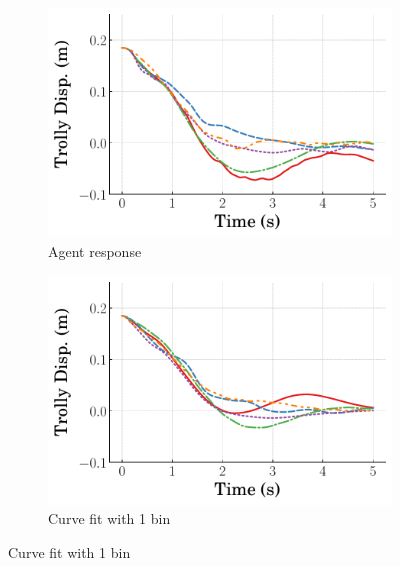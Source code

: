 %
\begin{figure}
    \centering
    \begin{subfigure}[b]{0.32\textwidth}
        \centering
        \includegraphics[width=\textwidth]{figures/figures_Interpretability/Mean_ISE_dpcrane_cubic_1_bins/curve_fit_time_responses/RL_PD/agent_0p18_Trolly_Disp.pdf}
        \caption{Agent response}
        \label{subfig_chap5:dpcrane_RL_PD_trolley_0.185_init_agent_unclipped}
    \end{subfigure}
    \hfill
    \begin{subfigure}[b]{0.32\textwidth}
        \centering
        \includegraphics[width=\textwidth]{figures/figures_Interpretability/Mean_ISE_dpcrane_cubic_1_bins/curve_fit_time_responses/RL_PD/curve_fit_0p18_Trolly_Disp.pdf}
        \caption{Curve fit with 1 bin}
        \label{subfig_chap5:dpcrane_RL_PD_trolley_0.185_init_curve_fit_1_bins_unclipped}
    \end{subfigure}

\end{figure}
